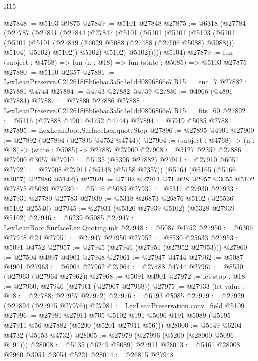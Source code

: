 \begin{lexlean}{R15}
\begin{coremodule}
{{{{{{{{{{{@27848 := @5103 @9875
@27849 := @5101 @27848
@27875 := @6318
    (@27784
      (@27787
        (@27811
          (@27844
            (@27847
              (@5101
                (@5101
                  (@5101
                    (@5103
                      (@5101
                        (@5101
                          (@5101 (@27849 (@6029 @5088 (@27488 (@27506 @5088) @5088))) @5104)
                          @5102)
                        @5102))
                    @5102)
                  @5102)
                @5102)))))
      @5104)
@27879 := fun (subject : @4768) => fun (n : @18) => fun (state : @5085) => @5103 @27875
@27880 := @5110 @2357
@27881 := LexLeanPreserve.C212618f8b6ebac3a5c1e1dd0896866e7.R15.__enc_7
@27882 := @27881 @4744
@27884 := @4743 @27882 @4739
@27886 := @4966 (@4891 @27884)
@27887 := @27880 @27886
@27888 := LexLeanPreserve.C212618f8b6ebac3a5c1e1dd0896866e7.R15.__fits_60
@27892 := @5116 (@27888 @4901 @4752 @4744)
@27894 := @5919 @5085 @27881
@27895 := LexLeanBoot.SurfaceLex.quoteStep
@27896 := @27895 @4901
@27900 := @27892 (@27894 (@27896 @4752 @4744))
@27904 := (subject : @4768) -> (n : @18) -> (state : @5085) -> @27887 @27900
@27908 := @5127 @2357 @27886 @27900 @3057
@27910 := @5135 (@5396 @27882)
@27911 := @27910 @6051
@27921 := @27908 @27911 (@5148 (@5158 @2357)) (@5164 (@5165 (@5166 @3057) @27886 @5142))
@27929 := @7102 @27911 @71 @28 @2957 @3055 @5102 @27875 @5089
@27930 := @5146 @5085
@27931 := @5317 @27930
@27933 := @27931 @27780 @27783
@27939 := @5318 @26873 @26876 @5102 (@25536 @5102 @25540)
@27945 := @27931 (@5320 @27939 @5102) (@5328 @27939 @5102)
@27946 := @6239 @5085
@27947 := LexLeanBoot.SurfaceLex.Quoting.mk
@27948 := @5087 @4752
@27950 := @6306 @27948 @24
@27951 := @27947 @27950
@27952 := @8530 @25633
@27953 := @5091 @4752
@27957 := @27945 (@27946 (@27951 (@27952 @27953)))
@27960 := @27504 @4897 @4901 @27948
@27961 := @27947 @4744
@27962 := @5087 @4901
@27963 := @6904 @27962
@27964 := @27488 @4744
@27967 := @8530 (@27963 (@27964 @27962))
@27968 := @5091 @4901
@27972 := let stop : @18 := @27960; @27946 (@27961 (@27967 @27968))
@27975 := @27933 (let value : @18 := @27788; @27957 @27972)
@27976 := @6193 @5085
@27979 := @27929 (@27894 (@27975 @27976))
@27981 := LexLeanPreservation.conv_field @5109
@27996 := @27981
    @27911
    @705
    @5102
    @191
    @5096
    @191
    @5089
    (@5195 @27911 @56 @27882 (@5200 (@5201 @27911 @56)))
@28000 := @5149 @6204 @4732 (@5153 @4732)
@28005 := @27979 (@27996 (@5200 (@28000 @5096 @191)))
@28008 := @5135 (@6249 @5089) @27911
@28013 := @5461 @28008 @2960 @3051 @3054 @5221
@28014 := @26815 @27948
}}}}}}}}}}}
\end{coremodule}
\end{lexlean}

